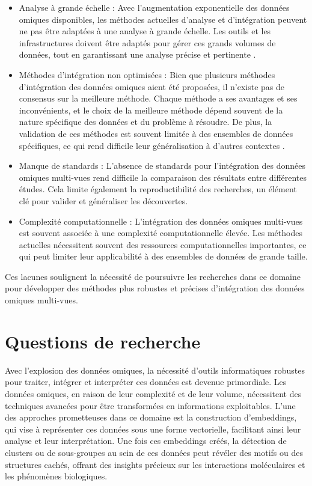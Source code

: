 \begin{itemize}
\item Analyse à grande échelle : Avec l'augmentation exponentielle des données omiques disponibles, les méthodes actuelles d'analyse et d'intégration peuvent ne pas être adaptées à une analyse à grande échelle. Les outils et les infrastructures doivent être adaptés pour gérer ces grands volumes de données, tout en garantissant une analyse précise et pertinente \cite{CaoGao2022}.

\item Méthodes d'intégration non optimisées : Bien que plusieurs méthodes d'intégration des données omiques aient été proposées, il n'existe pas de consensus sur la meilleure méthode. Chaque méthode a ses avantages et ses inconvénients, et le choix de la meilleure méthode dépend souvent de la nature spécifique des données et du problème à résoudre. De plus, la validation de ces méthodes est souvent limitée à des ensembles de données spécifiques, ce qui rend difficile leur généralisation à d'autres contextes \cite{Wekesa2023}.

\item Manque de standards : L'absence de standards pour l'intégration des données omiques multi-vues rend difficile la comparaison des résultats entre différentes études. Cela limite également la reproductibilité des recherches, un élément clé pour valider et généraliser les découvertes.

\item Complexité computationnelle : L'intégration des données omiques multi-vues est souvent associée à une complexité computationnelle élevée. Les méthodes actuelles nécessitent souvent des ressources computationnelles importantes, ce qui peut limiter leur applicabilité à des ensembles de données de grande taille.

\end{itemize}

Ces lacunes soulignent la nécessité de poursuivre les recherches dans ce domaine pour développer des méthodes plus robustes et précises d'intégration des données omiques multi-vues.

\section{Questions de recherche}
Avec l'explosion des données omiques, la nécessité d'outils informatiques robustes pour traiter, intégrer et interpréter ces données est devenue primordiale. Les données omiques, en raison de leur complexité et de leur volume, nécessitent des techniques avancées pour être transformées en informations exploitables. L'une des approches prometteuses dans ce domaine est la construction d'embeddings, qui vise à représenter ces données sous une forme vectorielle, facilitant ainsi leur analyse et leur interprétation. Une fois ces embeddings créés, la détection de clusters ou de sous-groupes au sein de ces données peut révéler des motifs ou des structures cachés, offrant des insights précieux sur les interactions moléculaires et les phénomènes biologiques.

